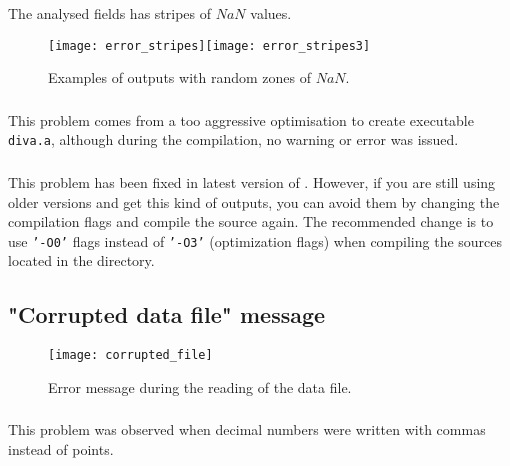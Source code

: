 The analysed fields has stripes of $NaN$ values.

\begin{figure}[htpb]
\centering
\texttt{[image: error\_stripes]}\texttt{[image: error\_stripes3]}
\caption{Examples of \diva outputs with random zones of $NaN$.\label{fig:error_stripes2}}
\end{figure}

\subsubsection{\question}

This problem comes from a too aggressive optimisation to create executable \texttt{diva.a}, although during the compilation, no warning or error was issued.  

\subsubsection{\answer}

This problem has been fixed in latest version of \diva. However, if you are still using older versions and get this kind of outputs, you can avoid them by changing the compilation flags and compile the source again. The recommended change is to use \texttt{'-O0'} flags instead of \texttt{'-O3'} (optimization flags) when compiling the sources located in the  directory.


\subsection{"Corrupted data file" message}


\begin{figure}[htpb]
\centering
\texttt{[image: corrupted\_file]}
\caption{Error message during the reading of the data file.}
\end{figure}

\subsubsection{\question}


This problem was observed when decimal numbers were written with commas instead of points.


\subsubsection{\answer}


